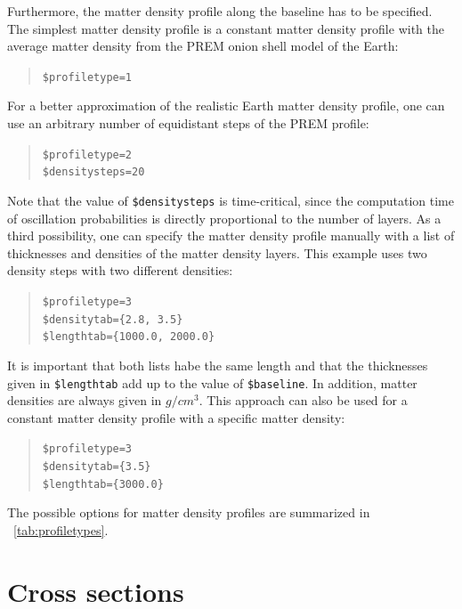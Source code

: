Furthermore, the matter density profile along the baseline
has to be specified. The simplest matter density profile is a constant matter density profile with the average matter density from the PREM\cite{Stacey} onion shell model of the Earth:
\begin{quote}
{\tt \$profiletype=1 }
\end{quote}
%
For a better approximation of the realistic Earth matter density profile, one can use an arbitrary number of equidistant steps of the PREM profile:
\begin{quote}
{\tt \$profiletype=2 } \\
{\tt \$densitysteps=20 }
\end{quote}
Note that the value of {\tt \$densitysteps} is time-critical, since the
computation time of oscillation probabilities is directly 
proportional to the number of layers.
%
As a  third possibility, one can specify the matter density profile 
manually with a list of thicknesses and densities of the matter density layers. This example uses two density steps with two different densities:
\begin{quote}
{\tt \$profiletype=3 } \\
{\tt \$densitytab=\{2.8, 3.5\}}\\
{\tt \$lengthtab=\{1000.0, 2000.0\}}\\
\end{quote}
It is important that both lists habe the same length and that the  thicknesses given in  {\tt \$lengthtab} add up to the value of
{\tt \$baseline}. In addition, matter densities are always given in $g/cm^3$.
%
This approach can also be used for a constant matter density profile with
a specific matter density:
\begin{quote}
{\tt \$profiletype=3 } \\
{\tt \$densitytab=\{3.5\}}\\
{\tt \$lengthtab=\{3000.0\}}\\
\end{quote}
The possible options for matter density profiles are summarized in \Tab~\ref{tab:profiletypes}.


\section{Cross sections}
\label{sec:cross_section}


